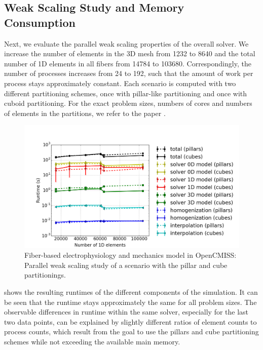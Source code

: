 \subsection{Weak Scaling Study and Memory Consumption}\label{sec:opencmiss_memory}

Next, we evaluate the parallel weak scaling properties of the overall solver. We increase the number of elements in the 3D mesh from 1232 to 8640 and the total number of 1D elements in all fibers from \num{14784} to \num{103680}. Correspondingly, the number of processes increases from 24 to 192, such that the amount of work per process stays approximately constant. Each scenario is computed with two different partitioning schemes, once with pillar-like partitioning and once with cuboid partitioning. For the exact problem sizes, numbers of cores and numbers of elements in the partitions, we refer to the paper \cite{Bradley:2018:EDB}. 

\begin{figure}
  \centering%
  \includegraphics[width=\textwidth]{images/results/studies/opencmiss_weak_scaling.png}%
  \caption{Fiber-based electrophysiology and mechanics model in OpenCMISS: Parallel weak scaling study of a scenario with the pillar and cube partitionings.}%
  \label{fig:opencmiss_weak_scaling}%
\end{figure}

 shows the resulting runtimes of the different components of the simulation. It can be seen that the runtime stays approximately the same for all problem sizes. The observable differences in runtime within the same solver, especially for the last two data points, can be explained by slightly different ratios of element counts to process counts, which result from the goal to use the pillars and cube partitioning schemes while not exceeding the available main memory.

